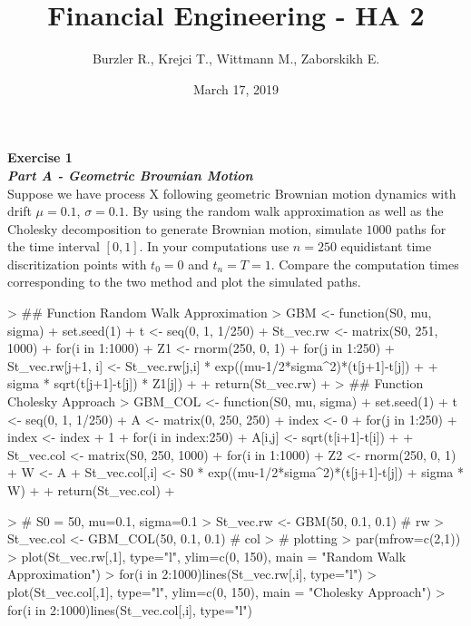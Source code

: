 \documentclass{article}
\title{Financial Engineering - HA 2}
\author{Burzler R., Krejci T., Wittmann M., Zaborskikh E.}
\date{March 17, 2019}
\begin{document}


\maketitle


\textbf{Exercise 1} \\

\textbf{\textit{Part A - Geometric Brownian Motion}} \\

Suppose we have process X following geometric Brownian motion dynamics with drift $\mu = 0.1$, $\sigma = 0.1$. By using the random walk approximation as well as the Cholesky decomposition to generate Brownian motion, simulate $1000$ paths for the time interval $[0,1]$. In your computations use $n = 250$ equidistant time discritization points with $t_0 = 0$ and $t_n = T = 1$. Compare the computation times
corresponding to the two method and plot the simulated paths.
\begin{Schunk}
\begin{Sinput}
> ## Function Random Walk Approximation
> GBM <- function(S0, mu, sigma){
+   set.seed(1)
+   t <- seq(0, 1, 1/250)
+   St_vec.rw <- matrix(S0, 251, 1000)
+   for(i in 1:1000){
+     Z1 <- rnorm(250, 0, 1)
+     for(j in 1:250){
+       St_vec.rw[j+1, i] <- St_vec.rw[j,i] * exp((mu-1/2*sigma^2)*(t[j+1]-t[j]) + 
+                                               sigma * sqrt(t[j+1]-t[j]) * Z1[j])
+       }}
+   return(St_vec.rw)
+ }
> ## Function Cholesky Approach
> GBM_COL <- function(S0, mu, sigma){
+   set.seed(1)
+   t <- seq(0, 1, 1/250)
+   A <- matrix(0, 250, 250)
+   index <- 0
+   for(j in 1:250){
+     index <- index + 1
+     for(i in index:250){
+       A[i,j] <- sqrt(t[i+1]-t[i])
+     }}
+   St_vec.col <- matrix(S0, 250, 1000)
+   for(i in 1:1000){
+     Z2 <- rnorm(250, 0, 1)
+     W <- A %*% Z2
+     St_vec.col[,i] <- S0 * exp((mu-1/2*sigma^2)*(t[j+1]-t[j]) + sigma * W)
+   }
+   return(St_vec.col)
+ }
\end{Sinput}
\end{Schunk}

\begin{Schunk}
\begin{Sinput}
> # S0 = 50, mu=0.1, sigma=0.1
> St_vec.rw <- GBM(50, 0.1, 0.1) # rw
> St_vec.col <- GBM_COL(50, 0.1, 0.1) # col
> # plotting
> par(mfrow=c(2,1))
> plot(St_vec.rw[,1], type="l", ylim=c(0, 150), main = "Random Walk Approximation")
> for(i in 2:1000){lines(St_vec.rw[,i], type="l")}
> plot(St_vec.col[,1], type="l", ylim=c(0, 150), main = "Cholesky Approach")
> for(i in 2:1000){lines(St_vec.col[,i], type="l")}
\end{Sinput}
\end{Schunk}
\end{document}
